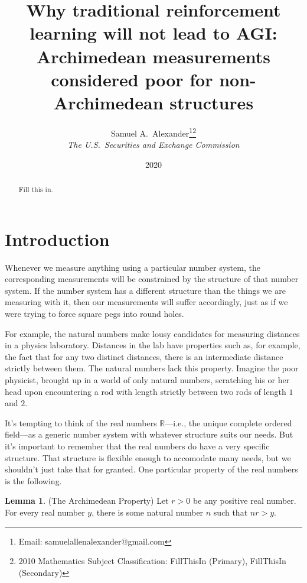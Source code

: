 \documentclass[reqno]{article}
\theoremstyle{definition}
\newtheorem{lemma}[theorem]{Lemma}
\begin{document}
\title{Why traditional reinforcement learning will not lead to AGI:
Archimedean measurements considered poor for non-Archimedean structures}

\author{Samuel A.~Alexander\thanks{Email:
samuelallenalexander@gmail.com}\hphantom{*}\footnote{2010 Mathematics 
Subject Classification: FillThisIn
(Primary), FillThisIn (Secondary)}\\
\emph{The U.S.\ Securities and Exchange Commission}}
\date{2020}
\maketitle

\begin{abstract}
    Fill this in.
\end{abstract}

\section{Introduction}

Whenever we measure anything using a particular number system, the
corresponding measurements will be constrained by the structure of that
number system. If the number system has a different structure than
the things we are measuring with it, then our
measurements will suffer accordingly, just as if we were trying to
force square pegs into round holes.

For example, the natural numbers make lousy candidates for measuring
distances in a physics laboratory. Distances in the lab have
properties such as, for example, the fact that for any two distinct
distances, there is an intermediate distance strictly between them.
The natural numbers lack this property. Imagine the poor physicist,
brought up in a world of only natural numbers, scratching his or her
head upon encountering a rod with length strictly between two rods
of length $1$ and $2$.

It's tempting to think of the real numbers $\mathbb R$---i.e., the unique
complete ordered field---as a generic number system with whatever
structure suits our needs. But it's important to remember that the
real numbers do have a very specific structure. That structure is
flexible enough to accomodate many needs, but we shouldn't just
take that for granted. One particular property of the real numbers
is the following.

\begin{lemma}
\label{specializedarchimedeanlemma}
(The Archimedean Property)
Let $r>0$ be any positive real number.
For every real number $y$, there is some natural number $n$
such that $nr>y$.
\end{lemma}
\end{document}

